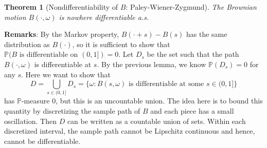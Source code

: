 \documentclass{article}
\theoremstyle{plain}
\newtheorem{theorem}{Theorem}
\theoremstyle{definition}
\begin{document}
\begin{theorem}[Nondifferentiability of $B$: Paley-Wiener-Zygmund]
The Brownian motion $B(\cdot,\omega)$ is nowhere differentiable a.s.
\end{theorem}

\textbf{Remarks}: By the Markov property, $B(\cdot+s)-B(s)$ has the same distribution as $B(\cdot)$, so it is sufficient to show that $\mathbb{P}(B\text{ is differentiable on }(0,1]) = 0.$ Let $D_s$ be the set such that the path $B(\cdot,\omega)$ is differentiable at $s$. By the previous lemma, we know $\mathbb{P}(D_s) = 0$ for any $s$. Here we want to show that 
\[
D = \bigcup_{s\in(0,1]}D_s = \{\omega : B(s,\omega)\text{ is differentiable at some }s\in(0,1]\}
\]
has $\mathbb{P}$-measure $0$, but this is an uncountable union. {The idea here is to bound this quantity by discretizing the sample path of $B$ and each piece has a small oscillation. Then $D$ can be written as a countable union of sets. Within each discretized interval, the sample path cannot be Lipschitz continuous and hence, cannot be differentiable.}
\end{document}
